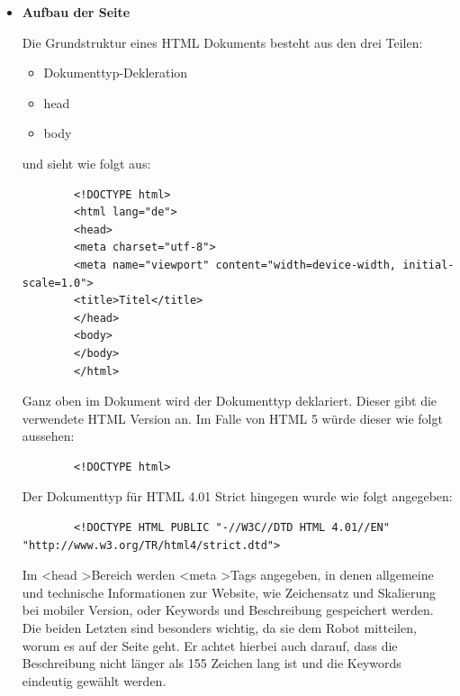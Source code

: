 {    \begin{itemize}
      \item \textbf{Aufbau der Seite}

        Die Grundstruktur eines HTML Dokuments besteht aus den drei Teilen:

        \begin{itemize}
          \item Dokumenttyp-Dekleration
          \item head
          \item body
        \end{itemize}

        und sieht wie folgt aus:

        \lstset{language=html}
      	\begin{lstlisting}
        <!DOCTYPE html>
        <html lang="de">
        <head>
        <meta charset="utf-8">
        <meta name="viewport" content="width=device-width, initial-scale=1.0">
        <title>Titel</title>
        </head>
        <body>
        </body>
        </html>
        \end{lstlisting}

        Ganz oben im Dokument wird der Dokumenttyp deklariert. Dieser gibt die verwendete HTML Version an. Im Falle von HTML 5 würde dieser wie folgt aussehen:

        \lstset{language=html}
        \begin{lstlisting}
        <!DOCTYPE html>
        \end{lstlisting}

        Der Dokumenttyp für HTML 4.01 Strict hingegen wurde wie folgt angegeben:

        \lstset{language=html}
        \begin{lstlisting}
        <!DOCTYPE HTML PUBLIC "-//W3C//DTD HTML 4.01//EN" "http://www.w3.org/TR/html4/strict.dtd">
        \end{lstlisting}

        Im \textless head \textgreater Bereich werden \textless meta \textgreater Tags angegeben, in denen allgemeine und technische Informationen zur Website, wie Zeichensatz
        und Skalierung bei mobiler Version, oder Keywords und Beschreibung gespeichert werden.
        Die beiden Letzten sind besonders wichtig, da sie dem Robot mitteilen, worum es auf der Seite geht. Er achtet hierbei auch darauf, dass die Beschreibung nicht
        länger als 155 Zeichen lang ist und die Keywords eindeutig gewählt werden.


\end{itemize}}
